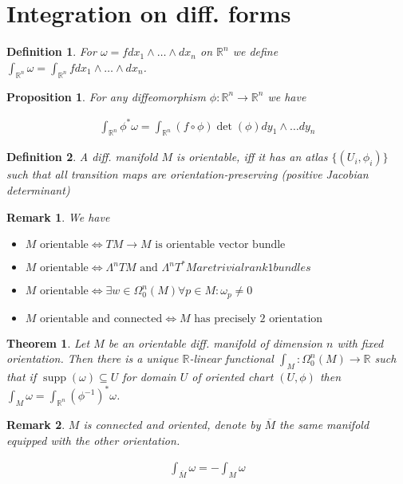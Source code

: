 \documentclass{scrartcl}
\newcommand{\R}{\mathbb R}
\newtheorem*{mydef}{Definition}
\newtheorem*{prop}{Proposition}
\newtheorem*{thm}{Theorem}
\newtheorem*{remark}{Remark}
\begin{document}
\section{Integration on diff. forms}

\begin{mydef}
  For $\omega=f dx_1 \wedge \dots \wedge dx_n$ on $\R^n$ we define $\int_{\R^n} \omega = \int_{\R^n} f dx_1 \wedge \dots \wedge dx_n$.
\end{mydef}

\begin{prop}
  For any diffeomorphism $\phi:\R^n\rightarrow\R^n$ we have 

  \begin{align}
    \int_{\R^n} \phi^*\omega = \int_{\R^n} (f\circ \phi) \operatorname{det}(\phi) dy_1 \wedge \dots dy_n
  \end{align}
\end{prop}

\begin{mydef}
  A diff. manifold $M$ is orientable, iff it has an atlas $\{(U_i,\phi_i)\}$  such that all transition maps are orientation-preserving (positive Jacobian determinant)
\end{mydef}

\begin{remark}
  We have

  \begin{itemize}
  \item $M \text{ orientable} \Leftrightarrow TM\rightarrow M \text{ is orientable vector bundle}$
  \item $M \text{ orientable} \Leftrightarrow \Lambda^n TM \text{ and } \Lambda^n T^*M are trivial rank 1 bundles$
  \item $M \text{ orientable} \Leftrightarrow \exists w\in \Omega^n_0(M) \forall p\in M: \omega_p \ne 0$
  \item $M \text{ orientable and connected} \Leftrightarrow M \text{ has precisely 2 orientation}$
  \end{itemize}
\end{remark}

\begin{thm}
  Let $M$ be an orientable diff. manifold of dimension $n$ with fixed orientation. Then there is a unique $\R$-linear functional $\int_M : \Omega_0^n(M) \rightarrow \R$ such that if $\operatorname{supp}(\omega)\subseteq U$ for domain $U$ of oriented chart $(U, \phi)$ then $\int_M \omega = \int_{\R^n}(\phi^{-1})^* \omega$.  
\end{thm}

\begin{remark}
  $M$ is connected and oriented, denote by $\overline M$ the same manifold equipped with the other orientation.

  \begin{align}
    \int_{\overline M} \omega = - \int_M \omega
  \end{align}
\end{remark}
\end{document}
